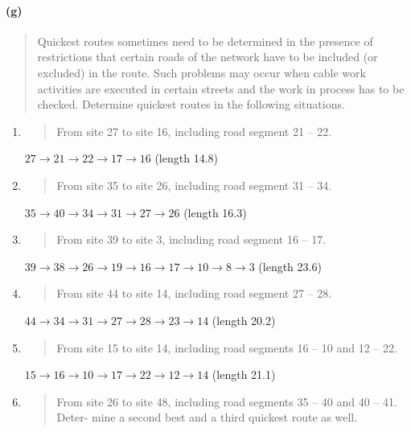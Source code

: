 \paragraph{(g)}

\begin{quote}
Quickest routes sometimes need to be determined in the presence of restrictions that certain roads of the network have to be included (or excluded) in the route. Such problems may occur when cable work activities are executed in certain streets and the work in process has to be checked. Determine quickest routes in the following situations.
\end{quote}

\begin{enumerate}[1.]
\item
\begin{quote}
From site 27 to site 16, including road segment 21 – 22.
\end{quote}

$ 27 \rightarrow 21 \rightarrow 22 \rightarrow 17 \rightarrow 16 $  (length 14.8)
\item
\begin{quote}
From site 35 to site 26, including road segment 31 – 34.
\end{quote}

$ 35 \rightarrow 40 \rightarrow 34 \rightarrow 31 \rightarrow 27 \rightarrow 26 $  (length 16.3)
\item
\begin{quote}
From site 39 to site 3, including road segment 16 – 17.
\end{quote}

$ 39 \rightarrow 38 \rightarrow 26 \rightarrow 19 \rightarrow 16 \rightarrow 17 \rightarrow 10 \rightarrow 8 \rightarrow 3 $  (length 23.6)
\item
\begin{quote}
From site 44 to site 14, including road segment 27 – 28.
\end{quote}

$ 44 \rightarrow 34 \rightarrow 31 \rightarrow 27 \rightarrow 28 \rightarrow 23 \rightarrow 14 $  (length 20.2)
\item
\begin{quote}
From site 15 to site 14, including road segments 16 – 10 and 12 – 22.
\end{quote}

$ 15 \rightarrow 16 \rightarrow 10 \rightarrow 17 \rightarrow 22 \rightarrow 12 \rightarrow 14 $  (length 21.1)
\item
\begin{quote}
From site 26 to site 48, including road segments 35 – 40 and 40 – 41. Deter-
mine a second best and a third quickest route as well.
\end{quote}


\end{enumerate}
